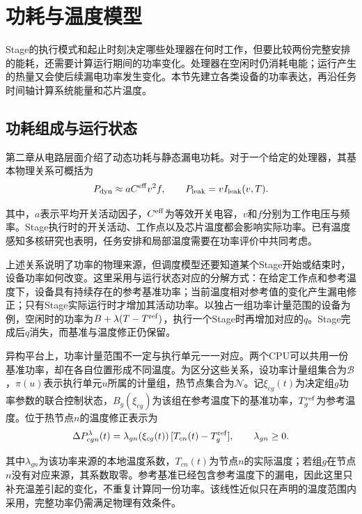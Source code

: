 \section{功耗与温度模型}

Stage的执行模式和起止时刻决定哪些处理器在何时工作，但要比较两份完整安排的能耗，还需要计算运行期间的功率变化。处理器在空闲时仍消耗电能；运行产生的热量又会使后续漏电功率发生变化。本节先建立各类设备的功率表达，再沿任务时间轴计算系统能量和芯片温度。

\subsection{功耗组成与运行状态}

第二章从电路层面介绍了动态功耗与静态漏电功耗。对于一个给定的处理器，其基本物理关系可概括为\cite{source1}
\begin{equation}
P_{\rm dyn}\approx aC^{\rm eff}v^2f,\qquad
P_{\rm leak}=vI_{\rm leak}(v,T).
\label{eq:physical-power}
\end{equation}

其中，$a$表示平均开关活动因子，$C^{\rm eff}$为等效开关电容，$v$和$f$分别为工作电压与频率。Stage执行时的开关活动、工作点以及芯片温度都会影响实际功率。已有温度感知多核研究也表明，任务安排和局部温度需要在功率评价中共同考虑\cite{chantem2011,fdtm2022}。

上述关系说明了功率的物理来源，但调度模型还要知道某个Stage开始或结束时，设备功率如何改变。这里采用与运行状态对应的分解方式：在给定工作点和参考温度下，设备具有持续存在的参考基准功率；当前温度相对参考值的变化产生漏电修正；只有Stage实际运行时才增加其活动功率。以独占一组功率计量范围的设备为例，空闲时的功率为$B+\lambda(T-T^{\rm ref})$，执行一个Stage时再增加对应的$q$。Stage完成后$q$消失，而基准与温度修正仍保留。

异构平台上，功率计量范围不一定与执行单元一一对应。两个CPU可以共用一份基准功率，却在各自位置形成不同温度。为区分这些关系，设功率计量组集合为$\mathcal B$，$\pi(u)$表示执行单元$u$所属的计量组，热节点集合为$\mathcal N$。记$\xi_{cg}(t)$为决定组$g$功率参数的联合控制状态，$B_g(\xi_{cg})$为该组在参考温度下的基准功率，$T_g^{\rm ref}$为参考温度。位于热节点$n$的温度修正表示为
\begin{equation}
\Delta P^\lambda_{cgn}(t)=
\lambda_{gn}(\xi_{cg}(t))\,[T_{cn}(t)-T_g^{\rm ref}],
\qquad\lambda_{gn}\ge0.
\label{eq:local-leakage}
\end{equation}

其中$\lambda_{gn}$为该功率来源的本地温度系数，$T_{cn}(t)$为节点$n$的实际温度；若组$g$在节点$n$没有对应来源，其系数取零。参考基准已经包含参考温度下的漏电，因此这里只补充温差引起的变化，不重复计算同一份功率。该线性近似只在声明的温度范围内采用，完整功率仍需满足物理有效条件。

